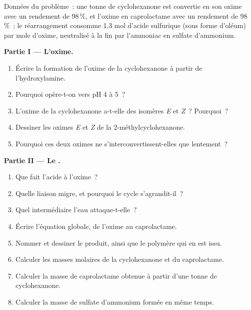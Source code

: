 \begin{problem}
\label{pb:b3:radicals-carbenes:1}
Données du problème~: une tonne de cyclohexanone est convertie en son oxime
avec un rendement de 98\,\%, et l'oxime en caprolactame avec un rendement
de 98\,\%~; le réarrangement consomme 1.3 mol d'acide sulfurique (sous forme
d'oléum) par mole d'oxime, neutralisé à la fin par l'ammoniac en sulfate
d'ammonium.

\medskip\noindent\textbf{Partie I --- L'oxime.}
\begin{enumerate}
  \item Écrire la formation de l'oxime de la cyclohexanone à partir de
        l'hydroxylamine.
  \item Pourquoi opère-t-on vers pH 4 à 5~?
  \item L'oxime de la cyclohexanone a-t-elle des isomères \textit{E} et \textit{Z}~? Pourquoi~?
  \item Dessiner les oximes \textit{E} et \textit{Z} de la 2-méthylcyclohexanone.
  \item Pourquoi ces deux oximes ne s'interconvertissent-elles que
        lentement~?
\end{enumerate}

\medskip\noindent\textbf{Partie II --- Le .}
\begin{enumerate}[resume]
  \item Que fait l'acide à l'oxime~?
  \item Quelle liaison migre, et pourquoi le cycle s'agrandit-il~?
  \item Quel intermédiaire l'eau attaque-t-elle~?
  \item Écrire l'équation globale, de l'oxime au caprolactame.
  \item Nommer et dessiner le produit, ainsi que le polymère qui en est
        issu.
  \item Calculer les masses molaires de la cyclohexanone et du caprolactame.
  \item Calculer la masse de caprolactame obtenue à partir d'une tonne de
        cyclohexanone.
  \item Calculer la masse de sulfate d'ammonium formée en même temps.
\end{enumerate}


\end{problem}
